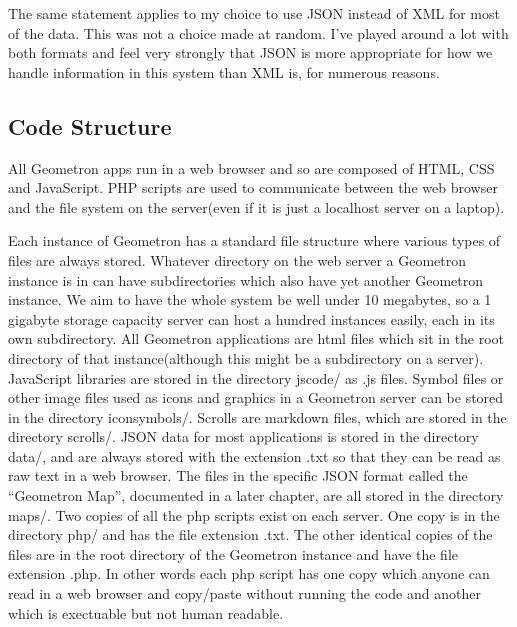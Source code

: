 The same statement applies to my choice to use JSON instead of XML for most of the data.  This was not a choice made at random.  I've played around a lot with both formats and feel very strongly that JSON is more appropriate for how we handle information in this system than XML is, for numerous reasons.  

\subsection{Code Structure}

All Geometron apps run in a web browser and so are composed of HTML, CSS and JavaScript.  PHP scripts are used to communicate between the web browser and the file system on the server(even if it is just a localhost server on a laptop).  

Each instance of Geometron has a standard file structure where various types of files are always stored.  Whatever directory on the web server a Geometron instance is in can have subdirectories which also have yet another Geometron instance. We aim to have the whole system be well under 10 megabytes, so a 1 gigabyte storage capacity server can host a hundred instances easily, each in its own subdirectory.  All Geometron applications are html files which sit in the root directory of that instance(although this might be a subdirectory on a server).  JavaScript libraries are stored in the directory jscode/ as .js files.  Symbol files or other image files used as icons and graphics in a Geometron server can be stored in the directory iconsymbols/.  Scrolls are markdown files, which are stored in the directory scrolls/.  JSON data for most applications is stored in the directory data/, and are always stored with the extension .txt so that they can be read as raw text in a web browser.  The files in the specific JSON format called the ``Geometron Map'', documented in a later chapter, are all stored in the directory maps/.  Two copies of all the php scripts exist on each server.  One copy is in the directory php/ and has the file extension .txt.  The other identical copies of the files are in the root directory of the Geometron instance and have the file extension .php. In other words each php script has one copy which anyone can read in a web browser and copy/paste without running the code and another which is exectuable but not human readable.  

